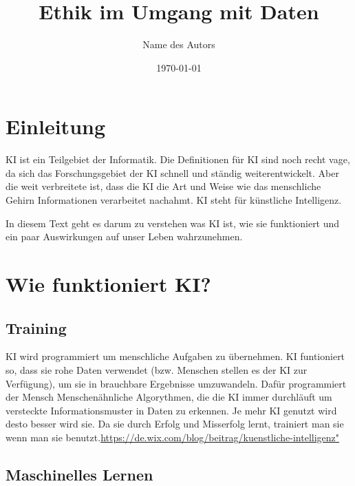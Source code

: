 \documentclass{report}
\title{Ethik im Umgang mit Daten}
\author{Name des Autors}
\date{\today}
\begin{document}
\maketitle


\tableofcontents

\chapter{Einleitung}

KI ist ein Teilgebiet der Informatik. Die Definitionen für KI sind noch recht vage, da sich das Forschungsgebiet der KI schnell und ständig weiterentwickelt. Aber die weit verbreitete ist,
dass die KI die Art und Weise wie das menschliche Gehirn Informationen verarbeitet nachahmt. KI steht für künstliche Intelligenz. 

In diesem Text geht es darum zu verstehen was KI ist, wie sie funktioniert und ein paar Auswirkungen auf unser Leben wahrzunehmen.

\chapter{Wie funktioniert KI?}

\section{Training}
KI wird programmiert um menschliche Aufgaben zu übernehmen.
KI funtioniert so, dass sie rohe Daten verwendet (bzw. Menschen stellen es der KI zur Verfügung), um sie in brauchbare Ergebnisse umzuwandeln.
Dafür programmiert der Mensch Menschenähnliche Algorythmen, die die KI immer durchläuft um versteckte Informationsmuster in Daten zu erkennen.
Je mehr KI genutzt wird desto besser wird sie. Da sie durch Erfolg und Misserfolg lernt, trainiert man sie wenn man sie benutzt.\url{https://de.wix.com/blog/beitrag/kuenstliche-intelligenz"}

\section{ Maschinelles Lernen}
\end{document}
